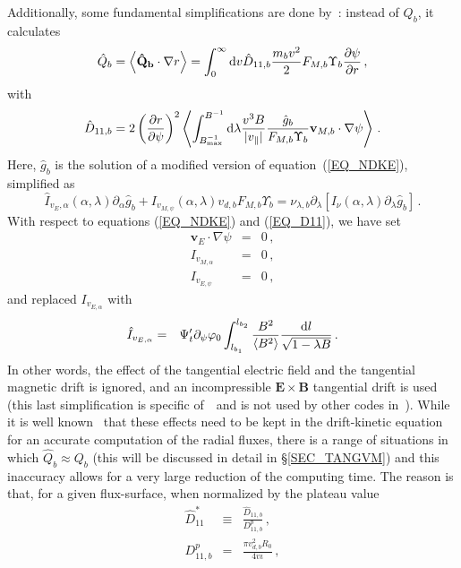 Additionally, some fundamental simplifications are done by~\DKES: instead of $Q_b$, it calculates
\begin{equation}
\hat Q_b=\left\langle{\mathbf{\hat Q_b}\cdot\nabla r}\right\rangle = \int_0^\infty\mathrm{d} v \hat D_{11,b}\frac{m_bv^2}{2} F_{M,b} \Upsilon_b\frac{\partial\psi}{\partial r}\,,\label{EQ_HATQ}
\end{equation}
with 
\begin{equation}
\hat D_{11,b} = 2\left(\frac{\partial r}{\partial\psi}\right)^2\left\langle\int_{B^{-1}_{{\rm max}}}^{B^{-1}}\mathrm{d}\lambda\frac{v^3 B}{|v_\parallel |}\frac{\hat g_b}{F_{M,b}\Upsilon_b}\mathbf{v}_{M,b}\cdot\nabla\psi\right\rangle \,.
\end{equation}
Here, $\hat g_b$ is the solution of a modified version of equation~(\ref{EQ_NDKE}), simplified as
\begin{equation}
\hat I_{v_E,\alpha}(\alpha,\lambda)\partial_\alpha \hat g_b +  I_{v_{M,\psi}}(\alpha,\lambda) {v_{d,b}} F_{M,b}\Upsilon_b
= \nu_{\lambda,b} \partial_\lambda\left[ I_\nu(\alpha,\lambda) \partial_\lambda \hat g_b\right]\,.
\label{EQ_DKES}
\end{equation}
With respect to equations (\ref{EQ_NDKE}) and (\ref{EQ_D11}), we have set 
\begin{eqnarray}
\mathbf{v}_E\cdot\nabla\psi&=&0\,,\nonumber\\
I_{v_{M,\alpha}}&=&0\,,\nonumber\\
I_{v_{E,\psi}}&=&0\,,\label{EQ_BINTDKES}
\end{eqnarray}
and replaced $I_{v_{E,\alpha}}$ with
\begin{eqnarray}
\hat I_{v_{E,\alpha}}&=&\Psi_t'\partial_\psi\varphi_0\int_{l_{b_1}}^{l_{b_2}}\frac{B^2}{\left\langle{B^2}\right\rangle} \frac{\mathrm{d}l}{\sqrt{1-\lambda B}}\,.
\end{eqnarray}
In other words, the effect of the tangential electric field and the tangential magnetic drift is ignored, and an incompressible $\mathbf{E}\times\mathbf{B}$ tangential drift is used (this last simplification is specific of~\DKES~and is not used by other codes in~\citep{beidler2011icnts}). While it is well known~\citep{calvo2017sqrtnu} that these effects need to be kept in the drift-kinetic equation for an accurate computation of the radial fluxes, there is a range of situations in which $\hat Q_b\approx Q_b$ (this will be discussed in detail in \S\ref{SEC_TANGVM}) and this inaccuracy allows for a very large reduction of the computing time. The reason is that, for a given flux-surface, when normalized by the plateau value
\begin{eqnarray}
\hat D_{11}^*&\equiv& \frac{\hat D_{11,b}}{D_{11,b}^p}\,,\nonumber\\
D_{11,b}^p&=& \frac{\pi v_{d,b}^2 R_0}{4v\iota}\,,
\end{eqnarray}
